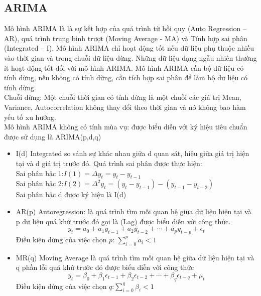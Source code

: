 \documentclass[conference]{IEEEtran}
\begin{document}
\subsection{ARIMA}
Mô hình ARIMA là là sự kết hợp của quá trình từ hồi quy (Auto Regression – AR), quá trình trung bình trượt (Moving Average - MA) và Tính hợp sai phân (Integrated – I). Mô hình ARIMA chỉ hoạt động tốt nếu dữ liệu phụ thuộc nhiều vào thời gian và trong chuỗi dữ liệu dừng. Những dữ liệu dạng ngẫu nhiên thường ít hoạt động tốt đối với mô hình ARIMA. Mô hình ARIMA cần bộ dữ liệu có tính dừng, nếu không có tính dừng, cần tích hợp sai phân để làm bộ dữ liệu có tính dừng.\\
Chuỗi dừng: Một chuỗi thời gian có tính dừng  là một chuỗi các giá trị Mean, Variance, Autocorrelation không thay đổi theo thời gian và nó không bao hàm yếu tố xu hướng.\\
Mô hình ARIMA không có tính mùa vụ: được biểu diễn với ký hiệu tiêu chuẩn được sử dụng là ARIMA(p,d,q)
\begin{itemize}
    \item I(d) Integrated so sánh sự khác nhau giữa d quan sát, hiệu giữa giá trị hiện tại và d giá trị trước đó. Quá trình sai phân được thực hiện: \\
    Sai phân bậc 1:\(I(1) = \Delta y_t = y_t - y_{t-1}\) \\
    Sai phân bậc 2:\(I(2) = \Delta^2 y_t = (y_t - y_{t-1}) - (y_{t-1} - y_{t-2})\) \\
    Sai phân bậc d được ký hiệu là I(d)
    \item AR(p) Autoregression: là quá trình tìm mối quan hệ giữa dữ liệu hiện tại và p dữ liệu quá khứ trước đó gọi là (Lag) được biểu diễn với công thức. 
    \[y_t = a_0 + a_1 y_{t-1} + a_2 y_{t-2} + \cdots + a_p y_{t-p} + \epsilon_t\]
    Điều kiện dừng của việc chọn \( p \): \(\sum_{i=0}^p a_i < 1\)
    \item MR(q) Moving Average là quá trình tìm mối quan hệ giữa dữ liệu hiện tại và q phần lỗi quá khứ trước đó được biểu diễn với công thức
    \[
    y_t = \beta_0 + \beta_1 \epsilon_{t-1} + \beta_2 \epsilon_{t-2} + \cdots + \beta_q \epsilon_{t-q} + \mu_t
    \]
    Điều kiện dừng của việc chọn \( q \):\(\sum_{i=0}^q \beta_i < 1\)
\end{itemize}
\end{document}
